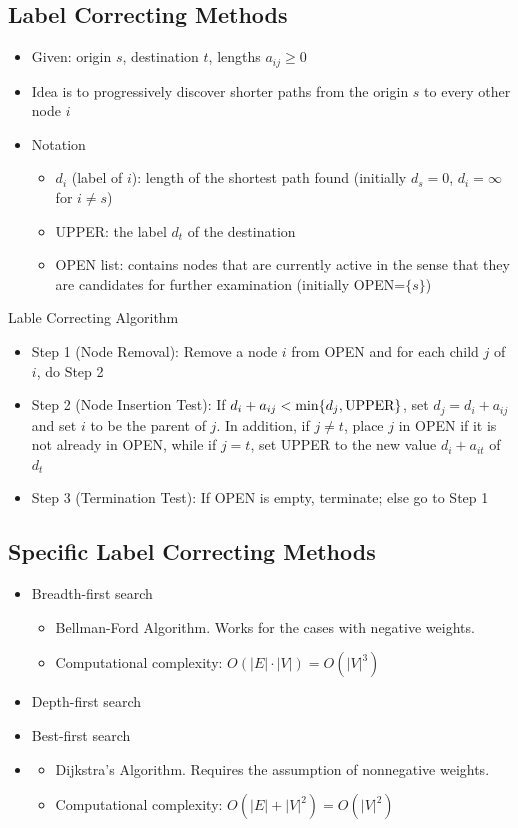 \subsection{Label Correcting Methods}
\begin{itemize}
    \item Given: origin $s$, destination $t$, lengths $a_{ij}\geq 0$
    \item Idea is to progressively discover shorter paths from the origin $s$ to every other node $i$
    \item Notation
    \begin{itemize}
        \item $d_i$ (label of $i$): length of the shortest path found (initially $d_s=0$, $d_i=\infty$ for $i\neq s$)
        \item UPPER: the label $d_t$ of the destination
        \item OPEN list: contains  nodes that are currently active in the sense that they are candidates for further examination (initially OPEN=$\{s\}$)
    \end{itemize}
\end{itemize}
Lable Correcting Algorithm
\begin{itemize}
    \item Step 1 (Node Removal): Remove a node $i$ from OPEN and for each child $j$ of $i$, do Step 2
    \item Step 2 (Node Insertion Test): If $d_i+a_{ij}<\min \{d_j,\text{\rm UPPER}\}$, set $d_j=d_i+a_{ij}$ and set $i$ to be the parent of $j$. In addition, if $j\neq t$, 
    place $j$ in OPEN if it is not already in OPEN, while if $j=t$, set UPPER to the new value $d_i+a_{it}$ of $d_t$
    \item Step 3 (Termination Test): If OPEN is empty, terminate; else go to Step 1
\end{itemize}

\subsection{Specific Label Correcting Methods}
\begin{itemize}
    \item Breadth-first search
    \begin{itemize}
        \item Bellman-Ford Algorithm. Works for the cases with negative weights.
        \item Computational complexity: $O(|E|\cdot |V|)=O(|V|^3)$
    \end{itemize}
    \item Depth-first search
    \item Best-first search
    \item \begin{itemize}
        \item Dijkstra's Algorithm. Requires the assumption of nonnegative weights.
        \item Computational complexity: $O(|E| + |V|^2)=O(|V|^2)$
    \end{itemize}
\end{itemize}


